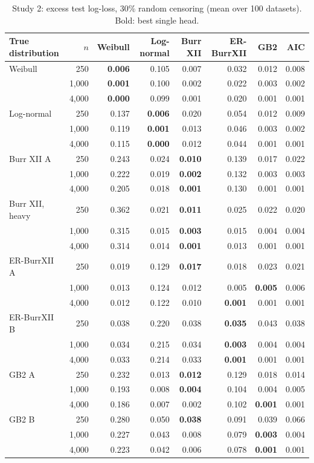 \begin{table}[htbp]
\centering
\caption{Study 2: excess test log-loss, 30\% random censoring (mean over 100 datasets). Bold: best single head.}\label{stab:misspec_ll_random30}
\small
\begin{tabular}{lrrrrrrr}
\toprule
True distribution & $n$ & Weibull & Log-normal & Burr XII & ER-BurrXII & GB2 & AIC \\
\midrule
Weibull & 250 & \textbf{0.006} & 0.105 & 0.007 & 0.032 & 0.012 & 0.008 \\
 & 1,000 & \textbf{0.001} & 0.100 & 0.002 & 0.022 & 0.003 & 0.002 \\
 & 4,000 & \textbf{0.000} & 0.099 & 0.001 & 0.020 & 0.001 & 0.001 \\
Log-normal & 250 & 0.137 & \textbf{0.006} & 0.020 & 0.054 & 0.012 & 0.009 \\
 & 1,000 & 0.119 & \textbf{0.001} & 0.013 & 0.046 & 0.003 & 0.002 \\
 & 4,000 & 0.115 & \textbf{0.000} & 0.012 & 0.044 & 0.001 & 0.001 \\
Burr XII A & 250 & 0.243 & 0.024 & \textbf{0.010} & 0.139 & 0.017 & 0.022 \\
 & 1,000 & 0.222 & 0.019 & \textbf{0.002} & 0.132 & 0.003 & 0.003 \\
 & 4,000 & 0.205 & 0.018 & \textbf{0.001} & 0.130 & 0.001 & 0.001 \\
Burr XII, heavy & 250 & 0.362 & 0.021 & \textbf{0.011} & 0.025 & 0.022 & 0.020 \\
 & 1,000 & 0.315 & 0.015 & \textbf{0.003} & 0.015 & 0.004 & 0.004 \\
 & 4,000 & 0.314 & 0.014 & \textbf{0.001} & 0.013 & 0.001 & 0.001 \\
ER-BurrXII A & 250 & 0.019 & 0.129 & \textbf{0.017} & 0.018 & 0.023 & 0.021 \\
 & 1,000 & 0.013 & 0.124 & 0.012 & 0.005 & \textbf{0.005} & 0.006 \\
 & 4,000 & 0.012 & 0.122 & 0.010 & \textbf{0.001} & 0.001 & 0.001 \\
ER-BurrXII B & 250 & 0.038 & 0.220 & 0.038 & \textbf{0.035} & 0.043 & 0.038 \\
 & 1,000 & 0.034 & 0.215 & 0.034 & \textbf{0.003} & 0.004 & 0.004 \\
 & 4,000 & 0.033 & 0.214 & 0.033 & \textbf{0.001} & 0.001 & 0.001 \\
GB2 A & 250 & 0.232 & 0.013 & \textbf{0.012} & 0.129 & 0.018 & 0.014 \\
 & 1,000 & 0.193 & 0.008 & \textbf{0.004} & 0.104 & 0.004 & 0.005 \\
 & 4,000 & 0.186 & 0.007 & 0.002 & 0.102 & \textbf{0.001} & 0.001 \\
GB2 B & 250 & 0.280 & 0.050 & \textbf{0.038} & 0.091 & 0.039 & 0.066 \\
 & 1,000 & 0.227 & 0.043 & 0.008 & 0.079 & \textbf{0.003} & 0.004 \\
 & 4,000 & 0.223 & 0.042 & 0.006 & 0.078 & \textbf{0.001} & 0.001 \\
\bottomrule
\end{tabular}
\end{table}
